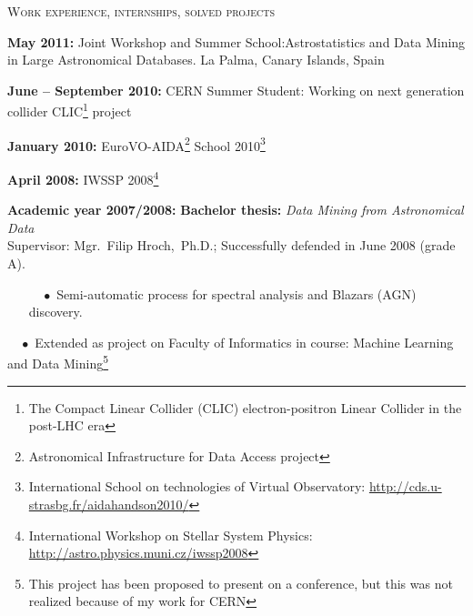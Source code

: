 \documentclass[10pt]{article}
\begin{document}
\begin{cv}
\begin{cvlist}{\large \textsc{Work experience, internships, solved projects}}
\begin{itemize}
 \end{itemize}



\item {\bf{May 2011:}} Joint Workshop and Summer
  School:Astrostatistics and Data Mining in Large Astronomical
  Databases.  La Palma, Canary Islands, Spain

\item {\bf{June -- September 2010:}} CERN Summer Student: Working on
  next generation collider CLIC\footnote{The Compact Linear Collider
    (CLIC) electron-positron Linear Collider in the post-LHC era} project

\item {\bf{January 2010:}} EuroVO-AIDA\footnote{Astronomical
  Infrastructure for Data Access project} School
  2010\footnote{International School on technologies of Virtual
    Observatory:
    \href{http://cds.u-strasbg.fr/aidahandson2010/}{http://cds.u-strasbg.fr/aidahandson2010/}}


\item {\bf{April 2008:}} IWSSP 2008\footnote{International Workshop on
  Stellar System Physics:
  \href{http://astro.physics.muni.cz/iwssp2008}{http://astro.physics.muni.cz/iwssp2008}}



\item {\bf{Academic year 2007/2008:}} {\bf{Bachelor thesis:}}
  \textit{Data Mining from Astronomical Data}\\Supervisor:
  Mgr.~Filip Hroch,~Ph.D.; Successfully defended in June 2008 (grade
  A).
\vspace{-0.3cm}
\begin{itemize}
\item[$\quad \bullet$ \hspace{-1.5mm}] Semi-automatic process for
  spectral analysis and Blazars (AGN) discovery.\\[-5mm]

\end{itemize}

\item[$\quad \bullet$ \hspace{-1.5mm}] Extended as project on Faculty
  of Informatics in course: Machine Learning and Data
  Mining\footnote{This project has been proposed to present on a
    conference, but this was not realized because of my work for CERN
  } \\[-5mm]



\end{cvlist}
\end{cv}
\end{document}
